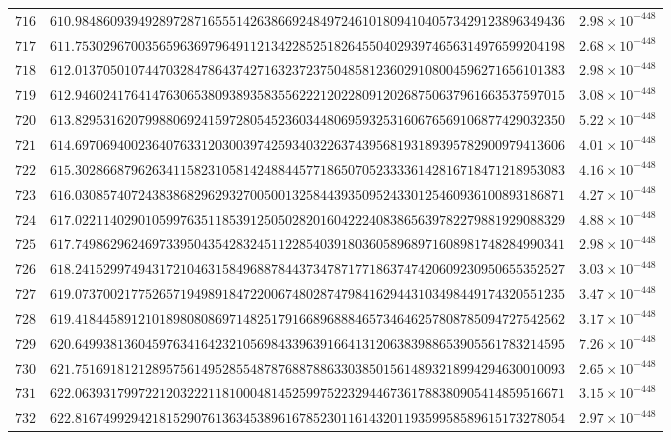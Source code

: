 \documentclass[12pt,reqno]{amsart}
\theoremstyle{remark}
\begin{document}
\begin{longtable}{clc}
$716$ & $610.9848609394928972871655514263866924849724610180941040573429123896349436$ & $2.98\times 10^{-448}$ \\
$717$ & $611.7530296700356596369796491121342285251826455040293974656314976599204198$ & $2.68\times 10^{-448}$ \\
$718$ & $612.0137050107447032847864374271632372375048581236029108004596271656101383$ & $2.98\times 10^{-448}$ \\
$719$ & $612.9460241764147630653809389358355622212022809120268750637961663537597015$ & $3.08\times 10^{-448}$ \\
$720$ & $613.8295316207998806924159728054523603448069593253160676569106877429032350$ & $5.22\times 10^{-448}$ \\
$721$ & $614.6970694002364076331203003974259340322637439568193189395782900979413606$ & $4.01\times 10^{-448}$ \\
$722$ & $615.3028668796263411582310581424884457718650705233336142816718471218953083$ & $4.16\times 10^{-448}$ \\
$723$ & $616.0308574072438386829629327005001325844393509524330125460936100893186871$ & $4.27\times 10^{-448}$ \\
$724$ & $617.0221140290105997635118539125050282016042224083865639782279881929088329$ & $4.88\times 10^{-448}$ \\
$725$ & $617.7498629624697339504354283245112285403918036058968971608981748284990341$ & $2.98\times 10^{-448}$ \\
$726$ & $618.2415299749431721046315849688784437347871771863747420609230950655352527$ & $3.03\times 10^{-448}$ \\
$727$ & $619.0737002177526571949891847220067480287479841629443103498449174320551235$ & $3.47\times 10^{-448}$ \\
$728$ & $619.4184458912101898080869714825179166896888465734646257808785094727542562$ & $3.17\times 10^{-448}$ \\
$729$ & $620.6499381360459763416423210569843396391664131206383988653905561783214595$ & $7.26\times 10^{-448}$ \\
$730$ & $621.7516918121289575614952855487876887886330385015614893218994294630010093$ & $2.65\times 10^{-448}$ \\
$731$ & $622.0639317997221203222118100048145259975223294467361788380905414859516671$ & $3.15\times 10^{-448}$ \\
$732$ & $622.8167499294218152907613634538961678523011614320119359958589615173278054$ & $2.97\times 10^{-448}$ \\

\end{longtable}
\end{document}
